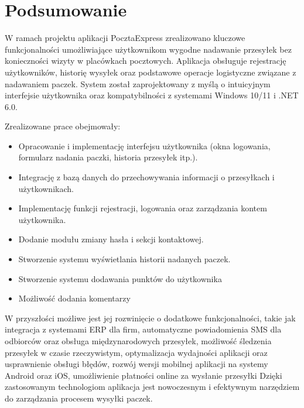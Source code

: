 \section{Podsumowanie}

W ramach projektu aplikacji PocztaExpress zrealizowano kluczowe funkcjonalności umożliwiające użytkownikom wygodne nadawanie przesyłek bez konieczności wizyty w placówkach pocztowych. Aplikacja obsługuje rejestrację użytkowników, historię wysyłek oraz podstawowe operacje logistyczne związane z nadawaniem paczek. System został zaprojektowany z myślą o intuicyjnym interfejsie użytkownika oraz kompatybilności z systemami Windows 10/11 i .NET 6.0.
\newline

\noindent Zrealizowane prace obejmowały:
\begin{itemize}
\item Opracowanie i implementację interfejsu użytkownika (okna logowania, formularz nadania paczki, historia przesyłek itp.).
\item Integrację z bazą danych do przechowywania informacji o przesyłkach i użytkownikach.
\item Implementację funkcji rejestracji, logowania oraz zarządzania kontem użytkownika.
\item Dodanie modułu zmiany hasła i sekcji kontaktowej.
\item Stworzenie systemu wyświetlania historii nadanych paczek.
\item Stworzenie systemu dodawania punktów do użytkownika
\item Możliwość dodania komentarzy
\end{itemize}

\noindent W przyszłości możliwe jest jej rozwinięcie o dodatkowe funkcjonalności, takie jak integracja z systemami ERP dla firm, automatyczne powiadomienia SMS dla odbiorców oraz obsługa międzynarodowych przesyłek, możliwość śledzenia przesyłek w czasie rzeczywistym, optymalizacja wydajności aplikacji oraz usprawnienie obsługi błędów, rozwój wersji mobilnej aplikacji na systemy Android oraz iOS, umożliwienie płatności online za wysłanie przesyłki Dzięki zastosowanym technologiom aplikacja jest nowoczesnym i efektywnym narzędziem do zarządzania procesem wysyłki paczek.

